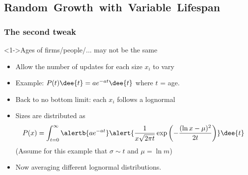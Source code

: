 

\subsection{Random\ Growth\ with\ Variable\ Lifespan}

\begin{frame}
  \frametitle{The second tweak}

  \begin{block}<1->{Ages of firms/people/... may not be the same}
    \begin{itemize}
    \item<2-> Allow the number of updates for each size $x_i$
      to vary
    \item<3-> Example: $ P(t) \dee{t} = ae^{-at} \dee{t} $ where $t$ = age.
    \item<4-> Back to no bottom limit: each $x_i$ follows
      a lognormal
    \item<5->
      Sizes are distributed as\cite{mitzenmacher2003a}
      $$
      P(x) = \int_{t=0}^\infty
      \alertb{a e^{-at}}
      \alert{
      \frac{1}{x \sqrt{2\pi t}}
      \exp
      \left(
        -\frac{(\ln x - \mu)^2}
        {2t}
      \right)
      }
      \dee{t}
      $$
      (Assume for this example that $\sigma \sim t$ and $\mu = \ln m$)
      \item<6->
      Now averaging different lognormal distributions.
    \end{itemize}
  \end{block}

\end{frame}

